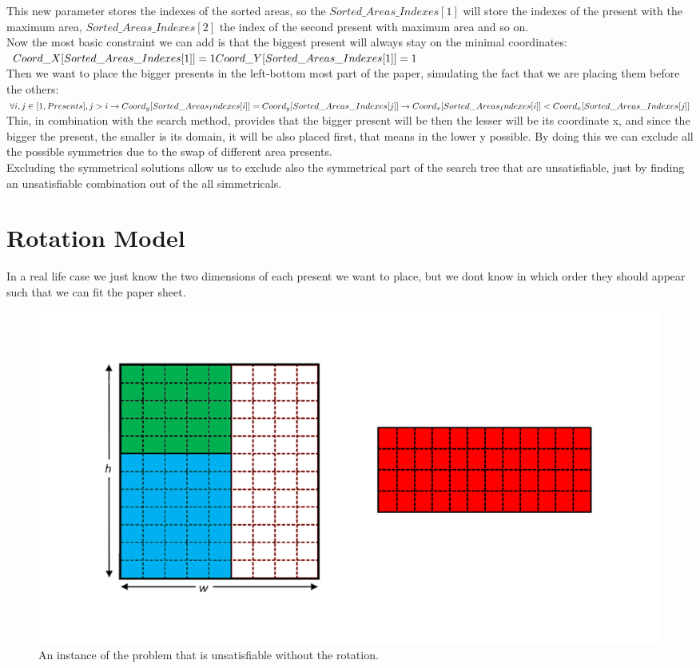 This new parameter stores the indexes of the sorted areas, so the $Sorted\_Areas\_Indexes[1]$ will store the indexes of the present with
the maximum area, $Sorted\_Areas\_Indexes[2]$ the index of the second present with maximum area and so on.\\
Now the most basic constraint we can add is that the biggest present will always stay on the minimal coordinates:\\
$
Coord\_X[Sorted\_Areas\_Indexes[1]] = 1\\
Coord\_Y[Sorted\_Areas\_Indexes[1]] = 1
$
\\

Then we want to place the bigger presents in the left-bottom most part of the paper, simulating the fact that we are placing them before
the others:\\
$
\forall i, j \in [1, Presents], j > i \rightarrow \\
    Coord_y[Sorted\_Areas_Indexes[i]] = Coord_y[Sorted\_Areas\_Indexes[j]] \rightarrow \\
    Coord_x[Sorted\_Areas_Indexes[i]] < Coord_x[Sorted\_Areas\_Indexes[j]]
$
\\
This, in combination with the search method, provides that the bigger present will be then the lesser will be its coordinate x,
and since the bigger the present, the smaller is its domain, it will be also placed first, that means in the lower y possible.
By doing this we can exclude all the possible symmetries due to the swap of different area presents.\\
Excluding the symmetrical solutions allow us to exclude also the symmetrical part of the search tree that are unsatisfiable, just
by finding an unsatisfiable combination out of the all simmetricals.



\section{Rotation Model}
In a real life case we just know the two dimensions of each present we want to place, but we dont know in which order they should appear such that we can fit the paper sheet.

\begin{figure}[ht]
	\centering
	\includegraphics[width=\textwidth]{images/rotated_problem.png}
	\caption{An instance of the problem that is unsatisfiable without the rotation.}
	\label{fig:overlaps}
\end{figure}

